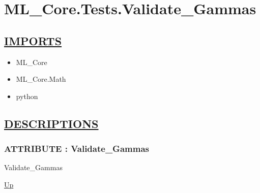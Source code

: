 \chapter*{ML\_Core.Tests.Validate\_Gammas}
\hypertarget{ecldoc:toc:ML_Core.Tests.Validate_Gammas}{}

\section*{\underline{IMPORTS}}
\begin{itemize}
\item ML\_Core
\item ML\_Core.Math
\item python
\end{itemize}

\section*{\underline{DESCRIPTIONS}}
\subsection*{ATTRIBUTE : Validate\_Gammas}
\hypertarget{ecldoc:ml_core.tests.validate_gammas}{}
\begin{minipage}[t]{\textwidth}
\begin{flushleft}
 Validate\_Gammas 
\end{flushleft}
\end{minipage}
\hyperlink{ecldoc:toc:ML_Core/Tests}{Up}

\par
\par
